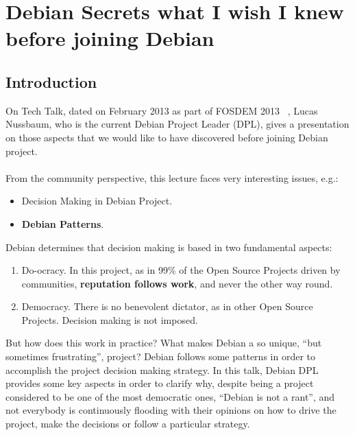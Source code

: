 \documentclass[11pt]{article}
\begin{document}
\pagebreak

\section{Debian Secrets what I wish I knew before joining Debian}
\label{sec:debiansecrets}
\subsection{Introduction}
On Tech Talk, dated on February 2013 as part of FOSDEM 2013 ~\cite{FOSS00}, Lucas Nussbaum, who is the current Debian Project Leader (DPL), gives a presentation on those aspects that we would like to have discovered before joining Debian project.\\
\\
From the community perspective, this lecture faces very interesting issues, e.g.:
\begin{itemize}
\item{Decision Making in Debian Project}.
\item{\textbf{Debian Patterns}}.
\end{itemize}
Debian determines that decision making is based in two fundamental aspects:
\begin{enumerate}\itemsep0pt
\item{Do-ocracy}. In this project, as in 99\% of the Open Source Projects driven by communities, \textbf{reputation follows work}, and never the other way round.
\item{Democracy}. There is no benevolent dictator, as in other Open Source Projects. Decision making is not imposed.
\end{enumerate}

But how does this work in practice? What makes Debian a so unique, ``but sometimes frustrating'', project? Debian follows some patterns in order to accomplish the project decision making strategy. In this talk, Debian DPL provides some key aspects in order to clarify why, despite being a project considered to be one of the most democratic ones, ``Debian is not a rant'', and not everybody is continuously flooding with their opinions on how to drive the project, make the decisions or follow a particular strategy.
\end{document}
